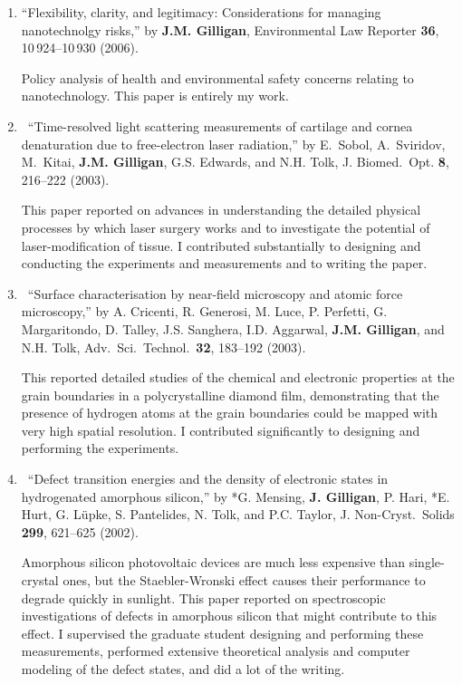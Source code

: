 \begin{enumerate}
%	
	\item
	\enquote{Flexibility, clarity, and legitimacy: Considerations for managing
	  nanotechnolgy risks,}  by \textbf{J.M. Gilligan}, Environmental Law Reporter
	  \textbf{36}, 10\,924--10\,930 (2006).  
	  \begin{credit}
	  Policy analysis of health and environmental safety concerns relating to nanotechnology. 
	  This paper is entirely my work.
	  \end{credit}
%	
	\item
	\textdagger\ 
	\enquote{Time-resolved light scattering measurements of cartilage and cornea
	  denaturation due to free-electron laser radiation,}  by E.~Sobol,
	  A.~Sviridov, M.~Kitai, \textbf{J.M. Gilligan}, G.S. Edwards, and N.H. Tolk, J.
	  Biomed.\ Opt. \textbf{8}, 216--222 (2003). 
	  \begin{credit}
	  This paper reported on advances in understanding the detailed physical processes by which laser surgery works and to investigate the potential of laser-modification of tissue.
	  I contributed substantially to designing and conducting the experiments and measurements and to writing the paper.
	  \end{credit}
%	
	\item
	\textdagger\ 
	\enquote{Surface characterisation by near-field microscopy and atomic force microscopy,} by A. Cricenti, R. Generosi, M. Luce, P. Perfetti, G. Margaritondo, D. Talley, J.S. Sanghera, I.D. Aggarwal, \textbf{J.M. Gilligan}, and N.H. Tolk, Adv.\ Sci.\ Technol.\ \textbf{32}, 183--192 (2003).
	\begin{credit}
	This reported detailed studies of the chemical and electronic properties at the grain boundaries in a polycrystalline diamond film, demonstrating that the presence of hydrogen atoms at the grain boundaries could be mapped with very high spatial resolution. I contributed significantly to designing and performing the experiments.
	\end{credit}
%
	\item 
	\textdagger\ 
	\enquote{Defect transition energies and the density of electronic states in hydrogenated amorphous silicon,} by *G. Mensing, \textbf{J. Gilligan}, P. Hari, *E. Hurt, G. L\"upke, S. Pantelides, N. Tolk, and P.C. Taylor, J. Non-Cryst.\ Solids \textbf{299}, 621--625 (2002).
	\begin{credit}
	Amorphous silicon photovoltaic devices are much less expensive than single-crystal ones, but the Staebler-Wronski effect causes their performance to degrade quickly in sunlight. This paper reported on spectroscopic investigations of defects in amorphous silicon that might contribute to this effect. I supervised the graduate student designing and performing these measurements, performed extensive theoretical analysis and computer modeling of the defect states, and did a lot of the writing. 

\end{credit}
\end{enumerate}
